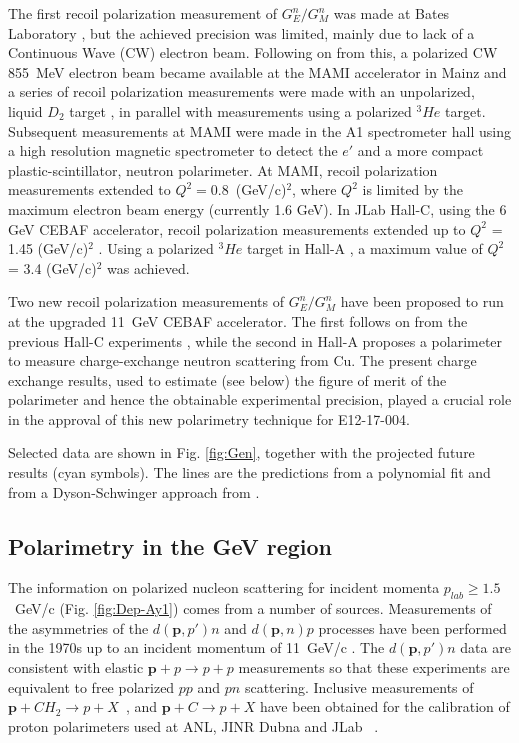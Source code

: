 \documentclass[twocolumn,epjc3]{svjour3}
\renewcommand{\vec}[1]{\boldsymbol{#1}} %
\begin{document}
The first recoil polarization measurement of $G_{E}^{n}/G_{M}^{n}$ was made at Bates Laboratory \cite{Eden:1994ji}, but the achieved precision was limited, mainly due to lack of a Continuous Wave (CW) electron beam.  Following on from this, a polarized CW 855~MeV electron beam became available at the MAMI accelerator in Mainz and a series of recoil polarization measurements were made with an unpolarized, liquid $D_2$ target \cite{Herberg:1999ud,Ostrick:1999xa}, in parallel with measurements using a polarized $^3\!He$ target.  Subsequent measurements at MAMI were made in the A1 spectrometer hall \cite{Glazier:2004ny} using a high resolution magnetic spectrometer to detect the $e'$ and a more compact plastic-scintillator, neutron polarimeter.  At MAMI, recoil polarization measurements extended to ${Q}^{2}=0.8$~(GeV/c)$^{2}$, where ${Q}^{2}$ is limited by the maximum electron beam energy (currently 1.6 GeV). In JLab Hall-C, using the 6 GeV CEBAF accelerator, recoil polarization measurements extended up to $Q^2$ = 1.45 (GeV/c)$^2$ \cite{Plaster:2005cx,Madey:2003av}. Using a polarized $^3\! He$ target in Hall-A \cite{Riordan:2010id}, a maximum value of $Q^2$ = 3.4 (GeV/c)$^2$ was achieved.

Two new recoil polarization measurements of $G_{E}^{n}/G_{M}^{n}$ have been proposed to run at the upgraded 11~GeV CEBAF accelerator. The first follows on from the previous Hall-C experiments \cite{PR12-11-009}, while the second in Hall-A \cite{PR12-17-004} proposes a polarimeter to measure charge-exchange neutron scattering from Cu. The present charge exchange results, used to estimate (see below) the figure of merit of the polarimeter and hence the obtainable experimental precision, played a crucial role in the approval of this new polarimetry technique for E12-17-004.

Selected data are shown in Fig. \ref{fig:Gen}, together with the projected future results (cyan symbols). The lines are the predictions from a polynomial fit and from a Dyson-Schwinger approach from \cite{Roberts:1994dr}.

\subsection{Polarimetry in the GeV region}
The information on polarized nucleon scattering for incident momenta $p_{lab}\ge 1.5$~GeV/c (Fig. \ref{fig:Dep-Ay1}) comes from a number of sources. Measurements of the asymmetries of the $d(\vec{p},p')n$ and $d(\vec{p},n)p$ processes have been performed in the 1970s up to an incident momentum of 11~GeV/c \cite{PhysRevLett.35.632,Kramer:1977pf}. The $d(\vec{p},p')n$ data are consistent with elastic $\vec{p}+ p \to p+p$ measurements \cite{Spinka:1983rz} so that these experiments are equivalent to free polarized $pp$ and $pn$ scattering. Inclusive measurements of $\vec{p}+CH_{2} \to p+X$~\cite{Azhgirey:2004yk}, and $\vec{p}+ C \to p+X$ have been obtained for the calibration of proton polarimeters used at ANL, JINR Dubna and JLab ~\cite{Cheung:1995ei,Alekseev:1999ag}.
\end{document}

